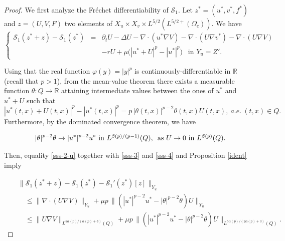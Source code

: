 \documentclass[10pt,a4paper]{amsart}
\begin{document}
\begin{proof}
%
We first analyze the Fr\'echet differentiability of $\mathcal{S}_1$.  Let $z^*=(u^*,v^*,f^*)$ and $z=(U,V,F)$ two elements of
${X}_u\times {X}_v\times L^{5/2}(L^{5/2+}(\Omega_c))$. We have
\begin{equation}\label{sss-3}
\left\{
\begin{array}{rcl}
\mathcal{S}_1(z^*+z)-\mathcal{S}_1(z^*)
&=&\partial_tU-\Delta U-\nabla\cdot(u^*\nabla V)-\nabla\cdot(U\nabla v^*)-\nabla\cdot(U\nabla V)\\
&& -rU + \mu\Big( |u^*+U|^p - |u^*|^p \Big) \ \ \mbox{ in } Y_u=Z'.
\end{array}
\right.
\end{equation}

Using that the real function  $\varphi(y)= |y|^p$ is continuously-differentiable in $\mathbb{R}$ (recall that $p>1$), from the mean-value theorem  there exists a measurable function $\theta:Q\rightarrow \mathbb{R}$ attaining intermediate values between the ones of $u^*$ and $u^*+U$ such that
\begin{equation}\label{sss-4}
|u^*(t,x)+U(t,x)|^p-|u^*(t,x)|^p=  p \, |\theta(t,x)|^{p-2}\theta(t,x) U(t,x),\ a.e.\ (t,x)\in Q.
\end{equation}
%
Furthermore, by the dominated convergence theorem, we have 
%

\begin{equation}\label{sss-4-1}
|\theta|^{p-2}\theta\to |u^*|^{p-2} u^* \hbox{ in $L^{\beta(p)/(p-1)}(Q)$, }
\mbox{ as } U\to 0 \hbox{ in $L^{\beta(p)}(Q)$}.
\end{equation}

Then, equality \eqref{sss-2-u} together with \eqref{sss-3}
 and \eqref{sss-4}  and Proposition \ref{ident}
imply

\begin{equation}\label{sss-5}
\begin{array}{rcl}
&&\|\mathcal{S}_1(z^*+z)-\mathcal{S}_1(z^*)-\mathcal{S}_1'(z^*)[z]\|_{Y_u}
\\
 && \quad \le  \|\nabla\cdot(U\nabla V)\|_{Y_u}
 +\mu p\,\|( |u^*|^{p-2} u^* - |\theta|^{p-2}\theta )U\|_{Y_u}\\
 &&\quad 
 \le \|U\nabla V\|_{L^{5\alpha(p)/(\alpha(p)+3)}(Q)}
 +\mu p\,\|( |u^*|^{p-2} u^* - |\theta|^{p-2}\theta )U\|_{L^{5\alpha(p)/(2\alpha(p)+3)}(Q)}.
\end{array}
\end{equation}


\end{proof}
\end{document}
